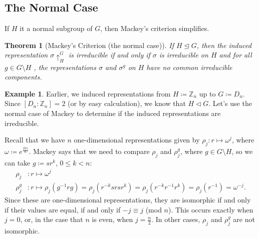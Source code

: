 \documentclass[12pt]{article}
\newcommand{\z}{\mathbb{Z}}
\newcommand\inv[1]{#1^{-1}}
\newcommand\paren[1]{\left( #1 \right)}
\newtheorem{theorem}{Theorem}[section]
\theoremstyle{definition}
\newtheorem{example}{Example}[section]
\begin{document}
\subsection{The Normal Case}
If $H$ it a normal subgroup of $G$, then Mackey's criterion simplifies.
\begin{theorem}[Mackey's Criterion (the normal case)]
    If $H \trianglelefteq G$, then the induced representation $\sigma \uparrow_H^G$ is irreducible if and only if $\sigma$ is irreducible on $H$ and for all $g \in G \setminus H$ , the representations $\sigma$ and $\sigma^g$ on $H$ have no common irreducible components.
\end{theorem}
\begin{example}
    Earlier, we induced representations from $H \coloneqq  \z_n$ up to $G \coloneqq  D_n$. Since $[D_n : \z_n] = 2$ (or by easy calculation), we know that $H \triangleleft G$. Let's use the normal case of Mackey to determine if the induced representations are irreducible. 
    
    Recall that we have $n$ one-dimensional representations given by $\rho_j : r \mapsto \omega^j$, where $\omega \coloneqq  e^{\frac{2\pi i}{n}}$. Mackey says that we need to compare $\rho_j$ and $\rho_j^g$, where $g \in G \setminus H$, so we can take $g \coloneqq  sr^k$, $0 \leq k < n$:
    \begin{equation}
        \begin{split}
            \rho_j & : r \mapsto \omega^j \\
            \rho_j^g & : r \mapsto \rho_j \paren{ \inv{g} r g } = \rho_j \paren{ r^{-k} srsr^k } = \rho_j \paren{ r^{-k} \inv{r} r^k } = \rho_j \paren{ \inv{r} } = \omega^{-j}.
        \end{split}
    \end{equation}
    Since these are one-dimensional representations, they are isomorphic if and only if their values are equal, if and only if $-j \equiv j$ (mod $n$). This occurs exactly when $j = 0$, or, in the case that $n$ is even, when $j = \frac{n}{2}$. In other cases, $\rho_j$ and $\rho_j^g$ are not isomorphic. 
    

\end{example}
\end{document}
